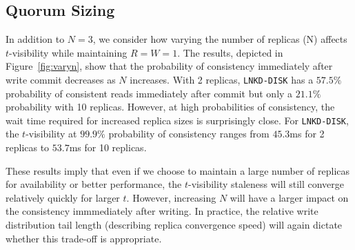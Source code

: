 \documentclass{vldb}
\newcommand{\subsectionskip}{-0em}
\begin{document}
\vspace{\subsectionskip}\subsection{Quorum Sizing}

In addition to $N$$=$$3$, we consider how varying the number of
replicas (N) affects $t$-visibility while maintaining
$R$$=$$W$$=$$1$. The results, depicted in Figure~\ref{fig:varyn}, show
that the probability of consistency immediately after write commit
decreases as $N$ increases.  With 2 replicas, \texttt{LNKD-DISK} has a
$57.5\%$ probability of consistent reads immediately after commit but
only a $21.1\%$ probability with 10 replicas.  However, at high
probabilities of consistency, the wait time required for increased
replica sizes is surprisingly close.  For \texttt{LNKD-DISK}, the
$t$-visibility at $99.9\%$ probability of consistency ranges from
$45.3$ms for 2 replicas to $53.7$ms for 10 replicas.

These results imply that even if we choose to maintain a large number
of replicas for availability or better performance, the $t$-visibility
staleness will still converge relatively quickly for larger $t$.
However, increasing $N$ will have a larger impact on the consistency
immmediately after writing.  In practice, the relative write
distribution tail length (describing replica convergence speed) will
again dictate whether this trade-off is appropriate.
\end{document}
